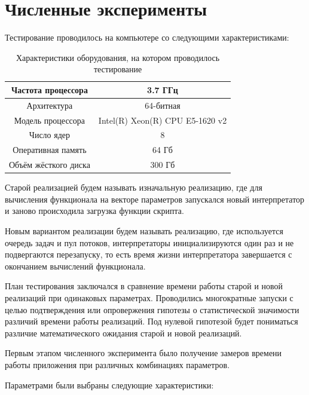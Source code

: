 \section*{Численные эксперименты}

Тестирование проводилось на компьютере со следующими характеристиками:

\begin{table}[h]
\centering
\begin{tabular}{| c | c |}
    \hline
    Частота процессора & 3.7 ГГц \\ \hline
    Архитектура & 64-битная \\ \hline
    Модель процессора & Intel(R) Xeon(R) CPU E5-1620 v2 \\ \hline
    Число ядер & 8 \\ \hline
    Оперативная память & 64 Гб \\ \hline
    Объём жёсткого диска & 300 Гб \\
    \hline
\end{tabular}
\caption{Характеристики оборудования,
на котором проводилось тестирование}
\end{table}

Старой реализацией будем называть
изначальную реализацию,
где для вычисления функционала
на векторе параметров запускался
новый интерпретатор и
заново происходила загрузка
функции скрипта.

Новым вариантом реализации
будем называть реализацию,
где используется очередь задач
и пул потоков,
интерпретаторы инициализируются
один раз и не подвергаются перезапуску,
то есть время жизни интерпретатора
завершается с окончанием
вычислений функционала.

План тестирования заключался
в сравнение времени работы
старой и новой реализаций
при одинаковых параметрах.
Проводились многократные запуски
с целью подтверждения или опровержения
гипотезы о статистической значимости различий
времени работы реализаций.
Под нулевой гипотезой будет пониматься
различие математического ожидания
старой и новой реализаций.

Первым этапом численного эксперимента
было получение замеров времени
работы приложения
при различных комбинациях параметров.

Параметрами были выбраны следующие характеристики:

